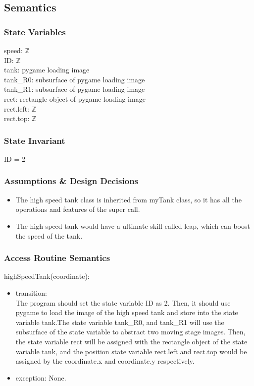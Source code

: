 \documentclass[12pt, titlepage]{article}
\begin{document}
		\subsection{Semantics}
		\subsubsection{State Variables}
		speed: $\mathbb{Z}$\\
		ID: $\mathbb{Z}$\\
		tank: pygame loading image\\
		tank\_R0: subsurface of pygame loading image\\
		tank\_R1: subsurface of pygame loading image\\
		rect: rectangle object of pygame loading image\\
		rect.left: $\mathbb{Z}$\\
		rect.top: $\mathbb{Z}$

		\subsubsection{State Invariant}
		ID = 2
		
		\subsubsection{Assumptions \& Design Decisions}
		\begin{itemize}
		\item The high speed tank class is inherited from myTank class, so it has all the operations and features of the super call. 
		
		\item The high speed tank would have a ultimate skill called leap, which can boost the speed of the tank.
		
		\end{itemize}
		\subsubsection{Access Routine Semantics}
        highSpeedTank(coordinate):
		\begin{itemize}
		\item transition: \\
		The program should set the state variable ID as 2. Then, it should use pygame to load the image of the high speed tank and store into the state variable tank.The state variable tank\_R0, and tank\_R1 will use the subsurface of the state variable to abstract two moving stage images. Then, the state variable rect will be assigned with the rectangle object of the state variable tank, and the position state variable rect.left and rect.top would be assigned by the coordinate.x and coordinate.y respectively.
		
		\item exception: None.
        \end{itemize}
        
\end{document}
